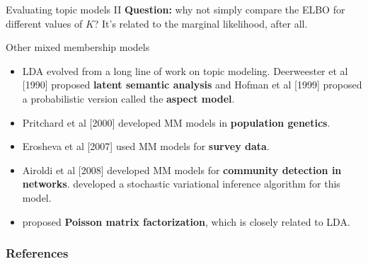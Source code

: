 \documentclass[aspectratio=169]{beamer}
\begin{document}
\begin{frame}[t]{Evaluating topic models II}
\textbf{Question: } why not simply compare the ELBO for different values of $K$? It's related to the marginal likelihood, after all. 
\end{frame}


\begin{frame}{Other mixed membership models}
\begin{itemize}
    \item LDA evolved from a long line of work on topic modeling. Deerweester et al [1990] proposed \textbf{latent semantic analysis} and Hofman et al [1999] proposed a probabilistic version called the \textbf{aspect model}.
    
    \item Pritchard et al [2000] developed MM models in \textbf{population genetics}.
    
    \item Erosheva et al [2007] used MM models for \textbf{survey data}.
    
    \item Airoldi et al [2008] developed MM models for \textbf{community detection in networks}. \citet{Gopalan2013-pz} developed a stochastic variational inference algorithm for this model.
    
    \item \citet{Gopalan2013-bc} proposed \textbf{Poisson matrix factorization}, which is closely related to LDA. 
\end{itemize}
\end{frame}

\begin{frame}[t,allowframebreaks]
        \frametitle{References}
        
        
\end{frame}
\end{document}
